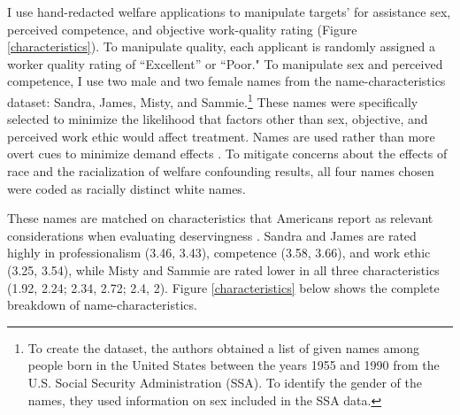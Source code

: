 \documentclass[12pt]{article}%
\begin{document}
\begin{doublespace}
I use hand-redacted welfare applications to manipulate targets’ for assistance sex, perceived competence, and objective work-quality rating (Figure \ref{characteristics}). To manipulate quality, each applicant is randomly assigned a worker quality rating of ``Excellent” or ``Poor." To manipulate sex and perceived competence, I use two male and two female names from the \cite{hayes_2020} name-characteristics dataset: Sandra, James, Misty, and Sammie.\footnote{To create the dataset, the authors obtained a list of given names among people born in the United States between the years 1955 and 1990 from the U.S. Social Security Administration (SSA). To identify the gender of the names, they used information on sex included in the SSA data.} These names were specifically selected to minimize the likelihood that factors other than sex, objective, and perceived work ethic would affect treatment. Names are used rather than more overt cues to minimize demand effects \citep{quidt_experimenter_2019, mummolo2019demand}. To mitigate concerns about the effects of race and the racialization of welfare confounding results, all four names chosen were coded as racially distinct white names.

These names are matched on characteristics that Americans report as relevant considerations when evaluating deservingness \citep{bobocel_justice-based_1998, katz_racial_1988, sniderman_symbolic_1986, sniderman_beyond_1996, mclosky_ethos}. Sandra and James are rated highly in professionalism (3.46, 3.43), competence (3.58, 3.66), and work ethic (3.25, 3.54), while Misty and Sammie are rated lower in all three characteristics (1.92, 2.24; 2.34, 2.72; 2.4, 2). Figure \ref{characteristics} below shows the complete breakdown of name-characteristics.


\end{doublespace}
\end{document}
